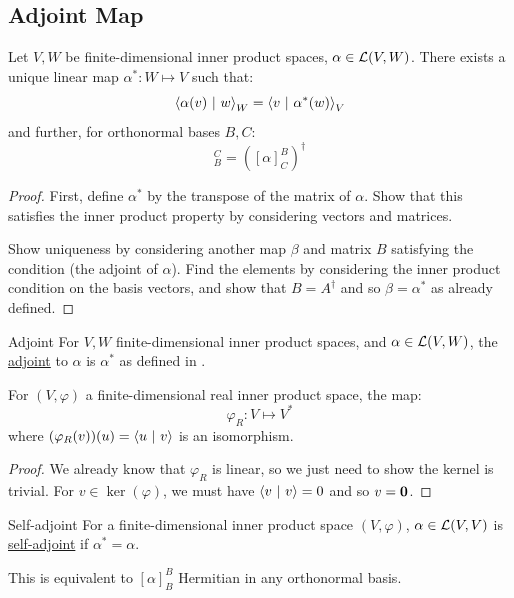\documentclass[../Main.tex]{subfiles}
\begin{document}
\subsection{Adjoint Map}
\begin{theorem}
    Let $V, W$ be finite-dimensional inner product spaces, $\alpha \in \mathcal{L}(V, W)$. There exists a unique linear map $\alpha^* : W \mapsto V$ such that:
    \begin{equation*}
        \left\langle \alpha(v)~\vert~w\right\rangle_W = \left\langle v~\vert~\alpha^*(w)\right\rangle_V
    \end{equation*}
    and further, for orthonormal bases $B, C$:
    \begin{equation*}
        [\alpha^*]^C_B = \left([\alpha]^B_C\right)^\dagger
    \end{equation*}
    \label{thmAdjoint}
\end{theorem}
\begin{proof}
    First, define $\alpha^*$ by the transpose of the matrix of $\alpha$. Show that this satisfies the inner product property by considering vectors and matrices.

    Show uniqueness by considering another map $\beta$ and matrix $B$ satisfying the condition (the adjoint of $\alpha$). Find the elements by considering the inner product condition on the basis vectors, and show that $B = A^\dagger$ and so $\beta = \alpha^*$ as already defined.
\end{proof}
\begin{definition}{Adjoint}
    For $V, W$ finite-dimensional inner product spaces, and $\alpha \in \mathcal{L}(V, W)$, the \underline{adjoint} to $\alpha$ is $\alpha^*$ as defined in .
\end{definition}
\begin{theorem}
    For $(V, \varphi)$ a finite-dimensional real inner product space, the map:
    \begin{equation*}
        \varphi_R : V \mapsto V^*
    \end{equation*}
    where $(\varphi_R(v))(u) = \left\langle u~\vert~v\right\rangle$ is an isomorphism.
    \label{thmRieszRepresentation}
\end{theorem}
\begin{proof}
    We already know that $\varphi_R$ is linear, so we just need to show the kernel is trivial. For $v \in \ker(\varphi)$, we must have $\left\langle v~\vert~v\right\rangle = 0$ and so $v = \boldsymbol{0}$.
\end{proof}
\begin{definition}{Self-adjoint}
    For a finite-dimensional inner product space $(V, \varphi)$, $\alpha \in \mathcal{L}(V, V)$ is \underline{self-adjoint} if $\alpha^* = \alpha$.
\end{definition}
This is equivalent to $[\alpha]^B_B$ Hermitian in any orthonormal basis.
\end{document}
